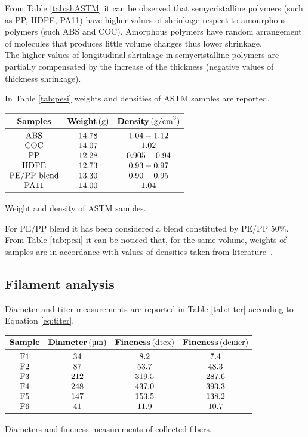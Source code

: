 \documentclass[a4paper, 11pt]{article}
\begin{document}
From Table \ref{tab:shASTM} it can be observed that semycristalline polymers (such as PP, HDPE, PA11) have higher values of shrinkage respect to amourphous polymers (such ABS and COC). Amorphous polymers have random arrangement of molecules that produces little volume changes thus lower shrinkage. \\
The higher values of longitudinal shrinkage in semycristalline polymers are partially compensated by the increase of the thickness (negative values of thickness shrinkage).

In Table \ref{tab:pesi} weights and densities of ASTM samples are reported.

\begin{table}[htp]
\centering
$
\begin{array}{ccc}
\toprule
\textbf{Samples} & \textbf{Weight}\,(\text{g}) & \textbf{Density}\,(\text{g/cm}^3) \\
\midrule
\text{ABS} & 14.78 & 1.04-1.12  \\
\text{COC} & 14.07 & 1.02 \\
\text{PP} & 12.28 & 0.905-0.94 \\
\text{HDPE} & 12.73 & 0.93-0.97 \\
\text{PE/PP blend} & 13.30 & 0.90-0.95 \\
\text{PA11} & 14.00 & 1.04 \\
\bottomrule
\end{array}
$
\caption{Weight and density of ASTM samples.}
\label{tab:pesi}
\end{table}

For PE/PP blend it has been considered a blend constituted by PE/PP $50\%$. From Table \ref{tab:pesi} it can be noticed that, for the same volume, weights of samples are in accordance with values of densities taken from literature~\cite{handbook}. 

\newpage

\subsection{Filament analysis}

Diameter and titer measurements are reported in Table \ref{tab:titer} according to Equation \ref{eq:titer}.
\begin{table}[htp]
\centering
$
\begin{array}{cccc}
\toprule
\textbf{Sample} & \textbf{Diameter} \, (\text{µm}) & \textbf{Fineness}\, (\text{dtex}) & \textbf{Fineness} \, (\text{denier}) \\
\midrule
\text{F1} & 34 & 8.2 & 7.4 \\
\text{F2} & 87 & 53.7 & 48.3 \\ 
\text{F3} & 212 & 319.5 & 287.6 \\
\text{F4} & 248 & 437.0 & 393.3 \\
\text{F5} & 147 & 153.5 & 138.2 \\
\text{F6} & 41 & 11.9 & 10.7 \\
\bottomrule
\end{array}
$
\caption{Diameters and fineness measurements of collected fibers.}
\label{tab:titer}
\end{table}
\end{document}
